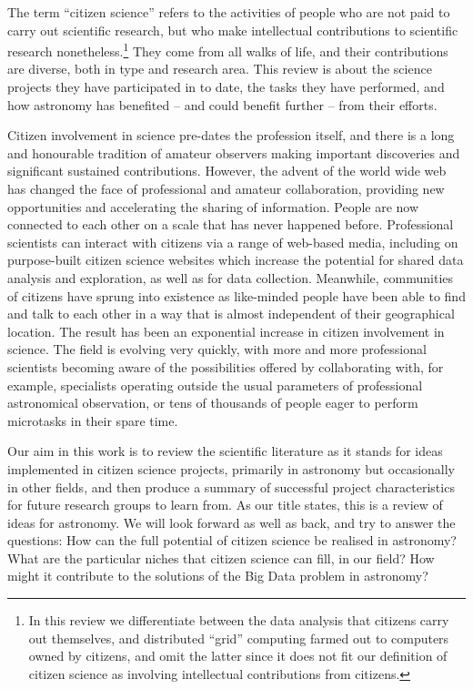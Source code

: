 \documentclass{ar2e}
\begin{document}
The term ``citizen science'' refers to the activities of people who are not paid
to carry out scientific research, but who make intellectual contributions to
scientific research nonetheless.\footnote{In this review we differentiate
between the data analysis that citizens carry out themselves, and  distributed
``grid'' computing farmed out to computers owned by citizens, and omit the
latter since it does not fit our definition of citizen science as involving
intellectual  contributions from citizens.} They come from all walks of life,
and their contributions are diverse, both in type and research area. This review
is about the science projects they have participated in to date, the tasks they
have performed, and how astronomy has benefited -- and could benefit further --
from their efforts.

Citizen involvement in science pre-dates the profession itself, and there is a
long and honourable tradition of amateur observers making important discoveries
and significant sustained contributions.  However, the advent of the
world wide web has changed the face of professional and amateur collaboration,
providing new opportunities and accelerating the sharing of information. People
are now connected to each other on a scale that has never happened before.
Professional scientists can interact with citizens via a range of web-based
media, including on purpose-built citizen science websites which increase the
potential for shared data analysis and exploration, as well as for data
collection. Meanwhile, communities of citizens have sprung into existence as
like-minded people have been able to find and talk to each other in a way that
is almost independent of their geographical location. The result has been an
exponential increase in citizen involvement in science. The field is evolving
very quickly, with more and more professional scientists becoming aware of the
possibilities offered by collaborating with, for example, specialists operating
outside the usual parameters of professional astronomical observation, or tens
of thousands of people eager to perform microtasks in their spare time.  

Our aim in this work is to review the scientific literature as it stands for
ideas implemented in citizen science projects, primarily in astronomy but
occasionally in other fields, and then produce a summary of successful project
characteristics for future research groups to learn from.  As our title states,
this is a review of ideas for astronomy. We will look forward as well as back,
and try to answer the questions: How can the full potential of citizen science
be realised in astronomy? What are the particular niches that citizen science
can fill, in our field? How might it contribute to the solutions of the Big Data
problem in astronomy?
\end{document}

